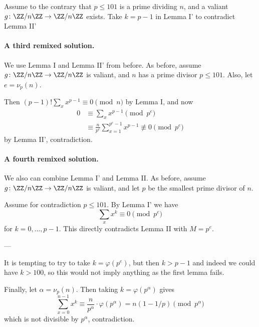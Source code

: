 Assume to the contrary that $p \le 101$ is a prime dividing
$n$, and a valiant $g \colon \ZZ / n \ZZ \to \ZZ / n \ZZ$ exists.
Take $k = p-1$ in Lemma I' to contradict Lemma II'

\paragraph{A third remixed solution.}
We use Lemma I and Lemma II' from before.
As before, assume $g \colon \ZZ / n \ZZ \to \ZZ / n \ZZ$ is valiant,
and $n$ has a prime divisor $p \le 101$.
Also, let $e = \nu_p(n)$.

Then $(p-1)! \sum_x x^{p-1} \equiv 0 \pmod{n}$ by Lemma I,
and now
\begin{align*}
  0 & \equiv \sum_x x^{p-1} \pmod{p^e} \\
  &\equiv \frac{n}{p^e} \sum_{x=1}^{p^e-1} x^{p-1} \not\equiv 0 \pmod{p^e}
\end{align*}
by Lemma II', contradiction.

\paragraph{A fourth remixed solution.}
We also can combine Lemma I' and Lemma II.
As before, assume $g \colon \ZZ / n \ZZ \to \ZZ / n \ZZ$ is valiant,
and let $p$ be the smallest prime divisor of $n$.

Assume for contradiction $p \le 101$.
By Lemma I' we have
\[ \sum_x x^k \equiv 0 \pmod{p^e} \]
for $k = 0, \dots, p-1$.
This directly contradicts Lemma II with $M = p^e$.

---


\begin{remark*}
  It is tempting to try to take $k = \varphi(p^e)$,
  but then $k > p-1$ and indeed we could have $k > 100$,
  so this would not imply anything as the first lemma fails.
\end{remark*}


Finally, let $\alpha = \nu_p(n)$.
Then taking $k = \varphi(p^\alpha)$ gives
\[ \sum_{x=0}^{n-1} x^k
  \equiv  \frac{n}{p^\alpha} \cdot \varphi(p^\alpha)
  = n(1-1/p) \pmod{p^\alpha} \]
which is not divisible by $p^\alpha$, contradiction.
